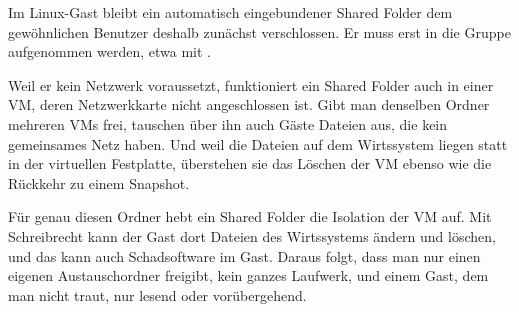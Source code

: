 Im Linux-Gast bleibt ein automatisch eingebundener Shared Folder dem gewöhnlichen Benutzer deshalb zunächst verschlossen. Er muss erst in die Gruppe  aufgenommen werden, etwa mit .

Weil er kein Netzwerk voraussetzt, funktioniert ein Shared Folder auch in einer VM, deren Netzwerkkarte nicht angeschlossen ist. Gibt man denselben Ordner mehreren VMs frei, tauschen über ihn auch Gäste Dateien aus, die kein gemeinsames Netz haben. Und weil die Dateien auf dem Wirtssystem liegen statt in der virtuellen Festplatte, überstehen sie das Löschen der VM ebenso wie die Rückkehr zu einem Snapshot.

Für genau diesen Ordner hebt ein Shared Folder die Isolation der VM auf. Mit Schreibrecht kann der Gast dort Dateien des Wirtssystems ändern und löschen, und das kann auch Schadsoftware im Gast. Daraus folgt, dass man nur einen eigenen Austauschordner freigibt, kein ganzes Laufwerk, und einem Gast, dem man nicht traut, nur lesend oder vorübergehend.

